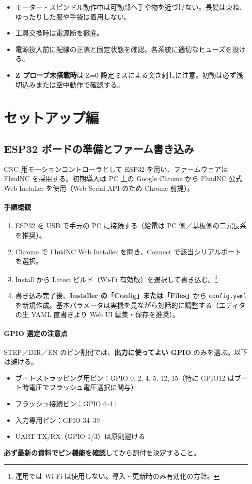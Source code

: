 \documentclass[uplatex,dvipdfmx]{ujarticle}
\begin{document}
\begin{itemize}
  \item モーター・スピンドル動作中は可動部へ手や物を近づけない。長髪は束ね、ゆったりした服や手袋は着用しない。
  \item 工具交換時は電源断を徹底。
  \item 電源投入前に配線の正誤と固定状態を確認。各系統に適切なヒューズを設ける。
  \item \textbf{Z プローブ未搭載時}は Z=0 設定ミスによる突き刺しに注意。初動は必ず浅切込みまたは空中動作で確認する。
\end{itemize}

\section{セットアップ編}

\subsection{ESP32 ボードの準備とファーム書き込み}

CNC 用モーションコントローラとして ESP32 を用い、ファームウェアは FluidNC \cite{fluidnc} を採用する。初期導入は PC 上の Google Chrome から FluidNC 公式 Web Installer \cite{fluidnc-installer}を使用（Web Serial API のため Chrome 前提\cite{chrome-webserial}）。
\paragraph{手順概観}
\begin{enumerate}
  \item ESP32 を USB で手元の PC に接続する（給電は PC 側／基板側の二冗長系を推奨）。
  \item Chrome で FluidNC Web Installer を開き、Connect で該当シリアルポートを選択。
  \item Install から Latest ビルド（Wi-Fi 有効版）を選択して書き込む。\footnote{運用では Wi-Fi は使用しない。導入・更新時のみ有効化の方針。}
  \item 書き込み完了後、\textbf{Installer の「Config」または「Files」}から \texttt{config.yaml} を新規作成。基本パラメータは実機を見ながら対話的に調整する（エディタの生 YAML 直書きより Web UI 編集・保存を推奨）。
\end{enumerate}

\paragraph{GPIO 選定の注意点}
STEP／DIR／EN のピン割付では、\textbf{出力に使ってよい GPIO} のみを選ぶ。以下は避ける\cite{espressif-gpio,espressif-datasheet}。
\begin{itemize}
  \item ブートストラッピング用ピン：GPIO 0, 2, 4, 5, 12, 15（特に GPIO12 はブート時電圧でフラッシュ電圧選択に関与）
  \item フラッシュ接続ピン：GPIO 6--11
  \item 入力専用ピン：GPIO 34--39
  \item UART TX/RX（GPIO 1/3）は原則避ける
\end{itemize}
\textbf{必ず最新の資料でピン機能を確認}してから割付を決定すること。
\end{document}
